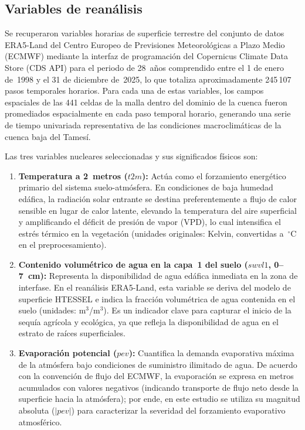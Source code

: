 \documentclass[12pt, a4paper]{article}
\begin{document}
\subsection{Variables de reanálisis}
\label{subsec:variables}

Se recuperaron variables horarias de superficie terrestre del conjunto de datos ERA5-Land del Centro Europeo de Previsiones Meteorológicas a Plazo Medio (ECMWF) mediante la interfaz de programación del Copernicus Climate Data Store (CDS API) para el periodo de 28~años comprendido entre el 1 de enero de~1998 y el 31 de diciembre de~2025, lo que totaliza aproximadamente 245\,107 pasos temporales horarios. Para cada una de estas variables, los campos espaciales de las 441 celdas de la malla dentro del dominio de la cuenca fueron promediados espacialmente en cada paso temporal horario, generando una serie de tiempo univariada representativa de las condiciones macroclimáticas de la cuenca baja del Tamesí.

Las tres variables nucleares seleccionadas y sus significados físicos son:

\begin{enumerate}
    \item \textbf{Temperatura a 2~metros ($t2m$):} Actúa como el forzamiento energético primario del sistema suelo-atmósfera. En condiciones de baja humedad edáfica, la radiación solar entrante se destina preferentemente a flujo de calor sensible en lugar de calor latente, elevando la temperatura del aire superficial y amplificando el déficit de presión de vapor (VPD), lo cual intensifica el estrés térmico en la vegetación (unidades originales: Kelvin, convertidas a~$^\circ$C en el preprocesamiento).
    \item \textbf{Contenido volumétrico de agua en la capa~1 del suelo ($swvl1$, 0--7~cm):} Representa la disponibilidad de agua edáfica inmediata en la zona de interfase. En el reanálisis ERA5-Land, esta variable se deriva del modelo de superficie HTESSEL e indica la fracción volumétrica de agua contenida en el suelo (unidades: m$^3$/m$^3$). Es un indicador clave para capturar el inicio de la sequía agrícola y ecológica, ya que refleja la disponibilidad de agua en el estrato de raíces superficiales.
    \item \textbf{Evaporación potencial ($pev$):} Cuantifica la demanda evaporativa máxima de la atmósfera bajo condiciones de suministro ilimitado de agua. De acuerdo con la convención de flujo del ECMWF, la evaporación se expresa en metros acumulados con valores negativos (indicando transporte de flujo neto desde la superficie hacia la atmósfera); por ende, en este estudio se utiliza su magnitud absoluta ($|pev|$) para caracterizar la severidad del forzamiento evaporativo atmosférico.
\end{enumerate}
\end{document}

